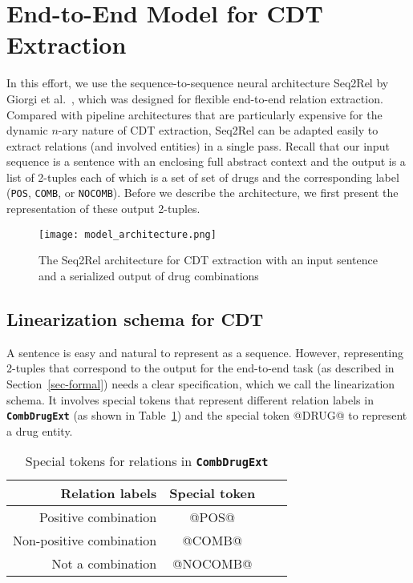 \documentclass[conference]{IEEEtran}
\begin{document}
\section{End-to-End Model for CDT Extraction}
\label{sec-methods}
In this effort, we use the sequence-to-sequence neural architecture Seq2Rel by Giorgi et al.~\cite{giorgi-etal-2022-sequence}, which was designed for flexible end-to-end relation extraction. Compared with pipeline architectures that are particularly expensive for the dynamic $n$-ary nature of CDT extraction, Seq2Rel can be adapted easily to extract  relations (and involved entities) in a single pass. Recall that our input sequence is a sentence with an enclosing full abstract context and the output is a list of 2-tuples each of which is a set of set of drugs and the corresponding label (\texttt{POS}, \texttt{COMB}, or \texttt{NOCOMB}). Before we describe the architecture, we first present the representation of these output 2-tuples. 

\begin{figure*}[t!]
    \centering
    \texttt{[image: model\_architecture.png]}
    \caption{The Seq2Rel architecture for CDT extraction with an input sentence and a serialized output of drug combinations}
    \label{fig:model}
\end{figure*}


\subsection{Linearization schema for CDT} \label{linearization}
A sentence is easy and natural to represent as a sequence. However, representing 2-tuples that correspond to the output for the   end-to-end task (as described in Section~\ref{sec-formal}) needs a clear specification, which we call the linearization schema. It involves special tokens that represent different relation labels in \textbf{\texttt{CombDrugExt}} (as shown in Table~\ref{tb:stoken}) and the special token @DRUG@ to represent a drug entity.  

\begin{table}[h]
\centering
\renewcommand{\arraystretch}{1.2}
\caption{Special tokens for relations in \textbf{\texttt{CombDrugExt}}}
\begin{tabular}{r ccc}
\toprule
Relation labels & Special token \\\midrule
Positive combination  & @POS@ \\
Non-positive combination   & @COMB@\\
 Not a combination & @NOCOMB@ \\
\bottomrule
\end{tabular}


\label{tb:stoken}
\end{table}
\end{document}
